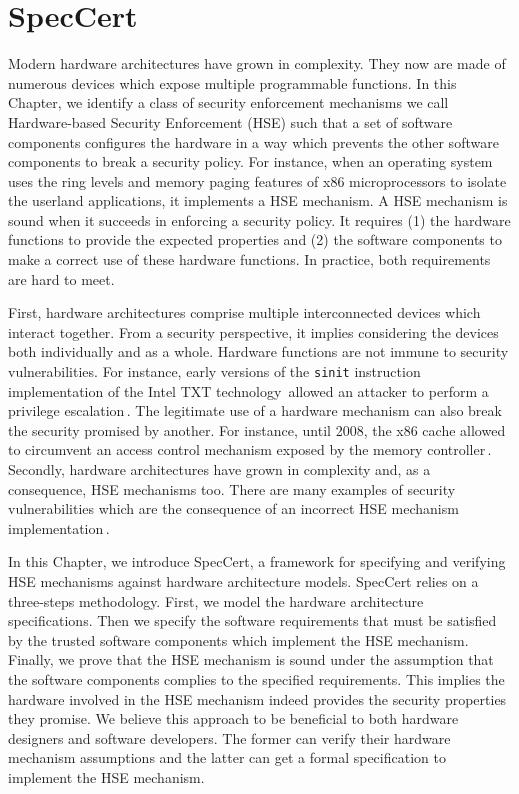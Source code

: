 \chapter{SpecCert}

Modern hardware architectures have grown in complexity.
%
They now are made of numerous devices which expose multiple programmable
functions.
%
In this Chapter, we identify a class of security enforcement mechanisms we call
Hardware-based Security Enforcement (HSE) such that a set of software components
configures the hardware in a way which prevents the other software components to
break a security policy.
%
For instance, when an operating system uses the ring levels and memory paging
features of x86 microprocessors to isolate the userland applications, it
implements a HSE mechanism.
%
A HSE mechanism is sound when it succeeds in enforcing a security policy.
%
It requires (1) the hardware functions to provide the expected properties and
(2) the software components to make a correct use of these hardware functions.
%
In practice, both requirements are hard to meet.

First, hardware architectures comprise multiple interconnected devices which
interact together.
%
From a security perspective, it implies considering the devices both
individually and as a whole.
%
Hardware functions are not immune to security vulnerabilities.
%
For instance, early versions of the \texttt{sinit} instruction implementation of
the Intel TXT technology\,\cite{intel2015txt} allowed an attacker to perform a
privilege escalation\,\cite{wojtczuk2011txtbug}.
%
The legitimate use of a hardware mechanism can also break the security promised
by another.
%
For instance, until 2008, the x86 cache allowed to circumvent an access control
mechanism exposed by the memory
controller\,\cite{wojtczuk2009smram,duflot2009smram}.
%
Secondly, hardware architectures have grown in complexity and, as a consequence,
HSE mechanisms too.
%
There are many examples of security vulnerabilities which are the consequence of
an incorrect HSE mechanism
implementation\,\cite{kallenberg2014failure,bulygin2014bios,intel2014chipsec}.

In this Chapter, we introduce SpecCert, a framework for specifying and verifying
HSE mechanisms against hardware architecture models.
%
SpecCert relies on a three-steps methodology.
%
First, we model the hardware architecture specifications.
%
Then we specify the software requirements that must be satisfied by the trusted
software components which implement the HSE mechanism.
%
Finally, we prove that the HSE mechanism is sound under the assumption that the
software components complies to the specified requirements.
%
This implies the hardware involved in the HSE mechanism indeed provides the
security properties they promise.
%
We believe this approach to be beneficial to both hardware designers and
software developers.
%
The former can verify their hardware mechanism assumptions and the latter can
get a formal specification to implement the HSE mechanism.


